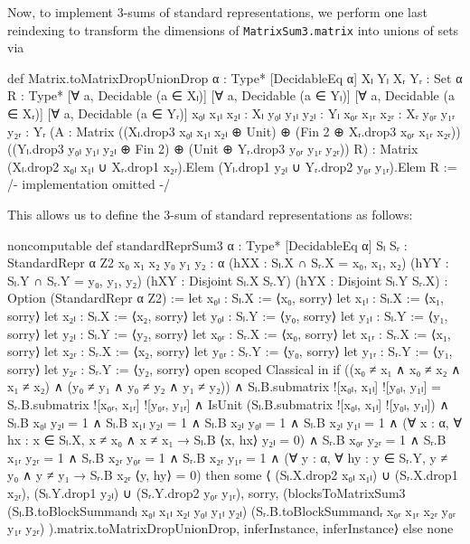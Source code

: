 Now, to implement 3-sums of standard representations, we perform one last reindexing to transform the dimensions of \texttt{MatrixSum3.matrix} into unions of sets via
\begin{leancode}
def Matrix.toMatrixDropUnionDrop {α : Type*}
    [DecidableEq α] {Xₗ Yₗ Xᵣ Yᵣ : Set α}
    {R : Type*}
    [∀ a, Decidable (a ∈ Xₗ)]
    [∀ a, Decidable (a ∈ Yₗ)]
    [∀ a, Decidable (a ∈ Xᵣ)]
    [∀ a, Decidable (a ∈ Yᵣ)]
    {x₀ₗ x₁ₗ x₂ₗ : Xₗ} {y₀ₗ y₁ₗ y₂ₗ : Yₗ}
    {x₀ᵣ x₁ᵣ x₂ᵣ : Xᵣ} {y₀ᵣ y₁ᵣ y₂ᵣ : Yᵣ}
    (A : Matrix
      ((Xₗ.drop3 x₀ₗ x₁ₗ x₂ₗ ⊕ Unit)
      ⊕ (Fin 2 ⊕ Xᵣ.drop3 x₀ᵣ x₁ᵣ x₂ᵣ))
      ((Yₗ.drop3 y₀ₗ y₁ₗ y₂ₗ ⊕ Fin 2)
      ⊕ (Unit ⊕ Yᵣ.drop3 y₀ᵣ y₁ᵣ y₂ᵣ))
      R) :
    Matrix
      (Xₗ.drop2 x₀ₗ x₁ₗ ∪ Xᵣ.drop1 x₂ᵣ).Elem
      (Yₗ.drop1 y₂ₗ ∪ Yᵣ.drop2 y₀ᵣ y₁ᵣ).Elem
      R := /- implementation omitted -/
\end{leancode}
This allows us to define the 3-sum of standard representations as follows:
\begin{leancode}
noncomputable def standardReprSum3 {α : Type*}
    [DecidableEq α]
    {Sₗ Sᵣ : StandardRepr α Z2}
    {x₀ x₁ x₂ y₀ y₁ y₂ : α}
    (hXX : Sₗ.X ∩ Sᵣ.X = {x₀, x₁, x₂})
    (hYY : Sₗ.Y ∩ Sᵣ.Y = {y₀, y₁, y₂})
    (hXY : Disjoint Sₗ.X Sᵣ.Y)
    (hYX : Disjoint Sₗ.Y Sᵣ.X) :
    Option (StandardRepr α Z2) :=
  let x₀ₗ : Sₗ.X := ⟨x₀, sorry⟩
  let x₁ₗ : Sₗ.X := ⟨x₁, sorry⟩
  let x₂ₗ : Sₗ.X := ⟨x₂, sorry⟩
  let y₀ₗ : Sₗ.Y := ⟨y₀, sorry⟩
  let y₁ₗ : Sₗ.Y := ⟨y₁, sorry⟩
  let y₂ₗ : Sₗ.Y := ⟨y₂, sorry⟩
  let x₀ᵣ : Sᵣ.X := ⟨x₀, sorry⟩
  let x₁ᵣ : Sᵣ.X := ⟨x₁, sorry⟩
  let x₂ᵣ : Sᵣ.X := ⟨x₂, sorry⟩
  let y₀ᵣ : Sᵣ.Y := ⟨y₀, sorry⟩
  let y₁ᵣ : Sᵣ.Y := ⟨y₁, sorry⟩
  let y₂ᵣ : Sᵣ.Y := ⟨y₂, sorry⟩
  open scoped Classical in if
    ((x₀ ≠ x₁ ∧ x₀ ≠ x₂ ∧ x₁ ≠ x₂) ∧
     (y₀ ≠ y₁ ∧ y₀ ≠ y₂ ∧ y₁ ≠ y₂))
    ∧ Sₗ.B.submatrix ![x₀ₗ, x₁ₗ] ![y₀ₗ, y₁ₗ] =
      Sᵣ.B.submatrix ![x₀ᵣ, x₁ᵣ] ![y₀ᵣ, y₁ᵣ]
    ∧ IsUnit (Sₗ.B.submatrix ![x₀ₗ, x₁ₗ] ![y₀ₗ, y₁ₗ])
    ∧ Sₗ.B x₀ₗ y₂ₗ = 1
    ∧ Sₗ.B x₁ₗ y₂ₗ = 1
    ∧ Sₗ.B x₂ₗ y₀ₗ = 1
    ∧ Sₗ.B x₂ₗ y₁ₗ = 1
    ∧ (∀ x : α, ∀ hx : x ∈ Sₗ.X, x ≠ x₀ ∧ x ≠ x₁
        → Sₗ.B ⟨x, hx⟩ y₂ₗ = 0)
    ∧ Sᵣ.B x₀ᵣ y₂ᵣ = 1
    ∧ Sᵣ.B x₁ᵣ y₂ᵣ = 1
    ∧ Sᵣ.B x₂ᵣ y₀ᵣ = 1
    ∧ Sᵣ.B x₂ᵣ y₁ᵣ = 1
    ∧ (∀ y : α, ∀ hy : y ∈ Sᵣ.Y, y ≠ y₀ ∧ y ≠ y₁
        → Sᵣ.B x₂ᵣ ⟨y, hy⟩ = 0)
  then
    some ⟨
      (Sₗ.X.drop2 x₀ₗ x₁ₗ) ∪ (Sᵣ.X.drop1 x₂ᵣ),
      (Sₗ.Y.drop1 y₂ₗ) ∪ (Sᵣ.Y.drop2 y₀ᵣ y₁ᵣ),
      sorry,
      (blocksToMatrixSum3
        (Sₗ.B.toBlockSummandₗ x₀ₗ x₁ₗ x₂ₗ y₀ₗ y₁ₗ y₂ₗ)
        (Sᵣ.B.toBlockSummandᵣ x₀ᵣ x₁ᵣ x₂ᵣ y₀ᵣ y₁ᵣ y₂ᵣ)
      ).matrix.toMatrixDropUnionDrop,
      inferInstance,
      inferInstance⟩
  else
    none
\end{leancode}
